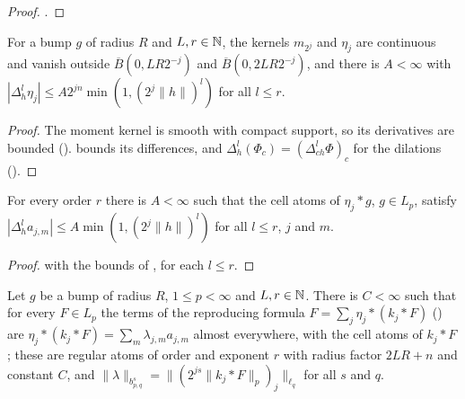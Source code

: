 \begin{proof}
\leanok
{}.
\end{proof}

\begin{lemma}
\label{lem:dual-kernel-bounds}
\leanok
{}
For a bump $g$ of radius $R$ and $L, r \in \mathbb{N}$, the kernels $m_{2^j}$ and $\eta_j$ are continuous
and vanish outside $\overline{B}(0, L R 2^{-j})$ and $\overline{B}(0, 2 L R 2^{-j})$, and there is
$A < \infty$ with $|\Delta_h^l \eta_j| \leq A 2^{jn} \min(1, (2^j \|h\|)^l)$ for all $l \leq r$.
\end{lemma}

\begin{proof}
\leanok
The moment kernel is smooth with compact support, so its derivatives are bounded
().  bounds its differences, and
$\Delta_h^l (\Phi_c) = (\Delta_{ch}^l \Phi)_c$ for the dilations ().
\end{proof}

\begin{lemma}
\label{lem:cell-atoms-dual}
\leanok
{}
For every order $r$ there is $A < \infty$ such that the cell atoms of $\eta_j * g$, $g \in L_p$,
satisfy $|\Delta_h^l a_{j,m}| \leq A \min(1, (2^j \|h\|)^l)$ for all $l \leq r$, $j$ and $m$.
\end{lemma}

\begin{proof}
\leanok
{} with the bounds of , for each $l \leq r$.
\end{proof}

\begin{theorem}
\label{thm:atomic-decomposition}
\leanok
{}
Let $g$ be a bump of radius $R$, $1 \leq p < \infty$ and $L, r \in \mathbb{N}$. There is $C < \infty$ such
that for every $F \in L_p$ the terms of the reproducing formula $F = \sum_j \eta_j * (k_j * F)$
() are $\eta_j * (k_j * F) = \sum_m \lambda_{j,m} a_{j,m}$ almost
everywhere, with the cell atoms of $k_j * F$; these are regular atoms of order and exponent $r$
with radius factor $2LR + n$ and constant $C$, and
$\|\lambda\|_{b^s_{p,q}} = \|(2^{js} \|k_j * F\|_p)_j\|_{\ell_q}$ for all $s$ and $q$.
\end{theorem}

